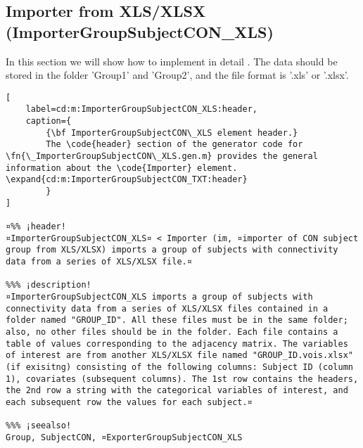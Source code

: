 \documentclass{tufte-handout}
\begin{document}
\clearpage

\subsection{Importer from XLS/XLSX (ImporterGroupSubjectCON\_XLS)}

In this section we will show how to implement in detail . The data should be stored in the folder 'Group1' and 'Group2', and the file format is '.xls' or '.xlsx'.

\begin{lstlisting}[
	label=cd:m:ImporterGroupSubjectCON_XLS:header,
	caption={
		{\bf ImporterGroupSubjectCON\_XLS element header.}
		The \code{header} section of the generator code for \fn{\_ImporterGroupSubjectCON\_XLS.gen.m} provides the general information about the \code{Importer} element. \expand{cd:m:ImporterGroupSubjectCON_TXT:header}
		}
]

¤%% ¡header!
¤ImporterGroupSubjectCON_XLS¤ < Importer (im, ¤importer of CON subject group from XLS/XLSX) imports a group of subjects with connectivity data from a series of XLS/XLSX file.¤

%%% ¡description!
¤ImporterGroupSubjectCON_XLS imports a group of subjects with connectivity data from a series of XLS/XLSX files contained in a folder named "GROUP_ID". All these files must be in the same folder; also, no other files should be in the folder. Each file contains a table of values corresponding to the adjacency matrix. The variables of interest are from another XLS/XLSX file named "GROUP_ID.vois.xlsx" (if exisitng) consisting of the following columns: Subject ID (column 1), covariates (subsequent columns). The 1st row contains the headers, the 2nd row a string with the categorical variables of interest, and each subsequent row the values for each subject.¤

%%% ¡seealso!
Group, SubjectCON, ¤ExporterGroupSubjectCON_XLS
\end{lstlisting}
\end{document}
